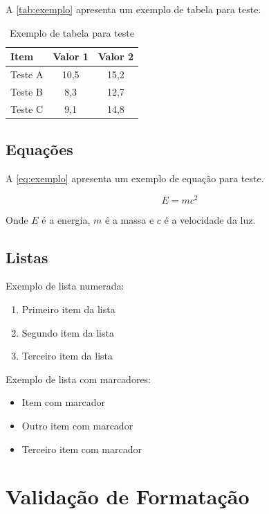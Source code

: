 \documentclass[mestrado,onehalfspacing,12pt,hyperref]{UnB-PPGT}
\begin{document}
A \autoref{tab:exemplo} apresenta um exemplo de tabela para teste.

\begin{table}[htbp]
\centering
\caption{Exemplo de tabela para teste}
\label{tab:exemplo}
\begin{tabular}{@{}lcc@{}}
\toprule
\textbf{Item} & \textbf{Valor 1} & \textbf{Valor 2} \\
\midrule
Teste A & 10,5 & 15,2 \\
Teste B & 8,3 & 12,7 \\
Teste C & 9,1 & 14,8 \\
\bottomrule
\end{tabular}
\end{table}

\section{Equações}
\label{sec:equacoes}

A \autoref{eq:exemplo} apresenta um exemplo de equação para teste.

\begin{equation}
E = mc^2
\label{eq:exemplo}
\end{equation}

Onde $E$ é a energia, $m$ é a massa e $c$ é a velocidade da luz.

\section{Listas}
\label{sec:listas}

Exemplo de lista numerada:

\begin{enumerate}
\item Primeiro item da lista
\item Segundo item da lista
\item Terceiro item da lista
\end{enumerate}

Exemplo de lista com marcadores:

\begin{itemize}
\item Item com marcador
\item Outro item com marcador
\item Terceiro item com marcador
\end{itemize}

\chapter{Validação de Formatação}
\label{cap:validacao}
\end{document}
